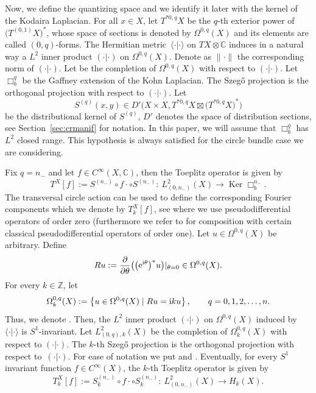 \documentclass[pdftex]{sigma}
\numberwithin{equation}{section}
\newcommand{\pr}{\partial}
\newcommand{\set}[1]{\left\{#1\right\}}
\newcommand{\To}{\rightarrow}
\begin{document}
	Now, we define the quantizing space and we identify it later with the kernel of the Kodaira Laplacian. For all $x\in X$, let $T^{*0,q}X$ be the $q$-th exterior power of $\bigl(T^{(0,1)}X\bigr)^*$, whose space of sections is denoted by $\Omega^{0,q}(X)$ and its elements are called $(0,q)$-forms. The Hermitian metric~$\langle \cdot | \cdot \rangle$ on $TX\otimes \mathbb{C}$ induces in a natural way a $L^2$ inner product $( \cdot | \cdot )$ on $\Omega^{0,q}(X)$. Denote as $\lVert \cdot\rVert$ the corresponding norm of $( \cdot | \cdot )$. Let  be the completion of $\Omega^{0,q}(X)$ with respect to $( \cdot | \cdot )$. Let $\Box^q_b$ be the Gaffney extension of the Kohn Laplacian. The Szeg\H{o} projection is the orthogonal projection
\smash{$S^{(q)} \colon L^2_{(0,q)}(X)\To \operatorname{Ker}\Box^q_b$}
	with respect to $( \cdot | \cdot )$. Let
\[
S^{(q)}(x,y)\in {D}'\bigl(X\times X,T^{*0,q}X\boxtimes\bigl(T^{*0,q}X\bigr)^*\bigr)
\]
 be the distributional kernel of $S^{(q)}$, ${D}'$ denotes the space of distribution sections, see Section~\ref{sec:crmanif} for notation. In this paper, we will assume that $\Box^q_b$ has $L^2$ closed range. This hypothesis is always satisfied for the circle bundle case we are considering.
	
	Fix $q=n_-$ and let $f\in C^{\infty}(X, \mathbb{C})$, then the Toeplitz operator is given by
	\[T^X[f]:=S^{(n_-)}\circ f\cdot\circ S^{(n_-)}\colon\ L^2_{(0,n_-)}(X)\To\operatorname{Ker}\Box^{n_-}_b .
	\]
	The transversal circle action can be used to define the corresponding Fourier components which we denote by $T_k^X[f]$, see \cite{gh} where we use pseudodifferential operators of order zero (furthermore we refer to \cite{sh} for composition with certain classical pseudodifferential operators of order one). Let $u\in\Omega^{0,q}(X)$ be arbitrary. Define
	\[
	Ru:=\frac{\pr}{\pr\theta}\bigl(\bigl({\rm e}^{{\rm i}\theta}\bigr)^*u\bigr)|_{\theta=0}\in\Omega^{0,q}(X).
	\]
	For every $k\in\mathbb Z$, let
	\[
	\Omega^{0,q}_k(X):=\set{u\in\Omega^{0,q}(X)\mid Ru={\rm i}k u},\qquad q=0,1,2,\dots,n .\]
	Thus, we denote . Then, the $L^2$ inner product $( \cdot | \cdot )$ on $\Omega^{0,q}(X)$
	induced by~$\langle \cdot | \cdot \rangle$ is $S^1$-invariant. Let $L^2_{(0,q), k}(X)$ be
	the completion of $\Omega_k^{0,q}(X)$ with respect to $( \cdot | \cdot )$.
	The $k$-th Szeg\H{o} projection is the orthogonal projection
\smash{$S^{(q)}_{k}\colon L^2_{(0,q)}(X)\To \bigl(\operatorname{Ker}\Box^q_b\bigr)_k$}
	with respect to~$( \cdot | \cdot )$. For ease of notation we put
	 and .
	Eventually, for every $S^1$ invariant function $f\in{C}^\infty(X)$, the $k$-th Toeplitz operator is given by
	\[
		T_{k}^X[f]:=S^{(n_-)}_{k}\circ f\cdot\circ S^{(n_-)}_{k}\colon\ L^2_{(0,n_-)}(X)\To H_k(X) .
	\]
	
\end{document}
